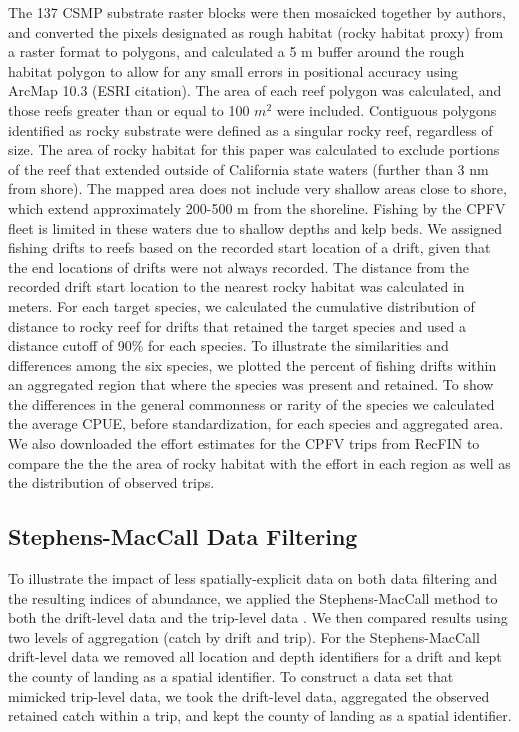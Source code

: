 \documentclass[
  12pt,
  authoryear,
  preprint,
  3p]{elsarticle}
\begin{document}
The 137 CSMP substrate raster blocks were then mosaicked together by
authors, and converted the pixels designated as rough habitat (rocky
habitat proxy) from a raster format to polygons, and calculated a 5 m
buffer around the rough habitat polygon to allow for any small errors in
positional accuracy using ArcMap 10.3 (ESRI citation). The area of each
reef polygon was calculated, and those reefs greater than or equal to
100 \(m^2\) were included. Contiguous polygons identified as rocky
substrate were defined as a singular rocky reef, regardless of size. The
area of rocky habitat for this paper was calculated to exclude portions
of the reef that extended outside of California state waters (further
than 3 nm from shore). The mapped area does not include very shallow
areas close to shore, which extend approximately 200-500 m from the
shoreline. Fishing by the CPFV fleet is limited in these waters due to
shallow depths and kelp beds. We assigned fishing drifts to reefs based
on the recorded start location of a drift, given that the end locations
of drifts were not always recorded. The distance from the recorded drift
start location to the nearest rocky habitat was calculated in meters.
For each target species, we calculated the cumulative distribution of
distance to rocky reef for drifts that retained the target species and
used a distance cutoff of 90\% for each species. To illustrate the
similarities and differences among the six species, we plotted the
percent of fishing drifts within an aggregated region that where the
species was present and retained. To show the differences in the general
commonness or rarity of the species we calculated the average CPUE,
before standardization, for each species and aggregated area. We also
downloaded the effort estimates for the CPFV trips from RecFIN to
compare the the the area of rocky habitat with the effort in each region
as well as the distribution of observed trips.

\hypertarget{stephens-maccall-data-filtering}{%
\subsection{Stephens-MacCall Data
Filtering}\label{stephens-maccall-data-filtering}}

To illustrate the impact of less spatially-explicit data on both data
filtering and the resulting indices of abundance, we applied the
Stephens-MacCall method to both the drift-level data and the trip-level
data \citeyearpar{Stephens:2004:MAS}. We then compared results using two
levels of aggregation (catch by drift and trip). For the
Stephens-MacCall drift-level data we removed all location and depth
identifiers for a drift and kept the county of landing as a spatial
identifier. To construct a data set that mimicked trip-level data, we
took the drift-level data, aggregated the observed retained catch within
a trip, and kept the county of landing as a spatial identifier.
\end{document}
